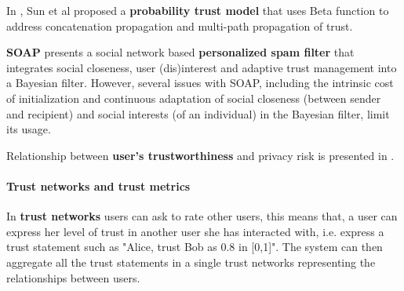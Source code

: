 
%
In \cite{zeng_trustaware_2014},
	Sun et al proposed a \textbf{probability trust model} that uses Beta function to address concatenation propagation and multi-path propagation of trust.


\textbf{SOAP} \cite{li_soap_2011} presents a social network based \textbf{personalized spam filter} that integrates social closeness,
	user (dis)interest and adaptive trust management into a Bayesian filter.
However,
	several issues with SOAP,
	including the intrinsic cost of initialization and continuous adaptation of social closeness (between sender and recipient) 
		and social interests (of an individual) in the Bayesian filter,
	limit its usage.

Relationship between \textbf{user’s trustworthiness} and privacy risk is presented in \cite{pandey_computing_2015}.





\paragraph{Trust networks and trust metrics}

In \textbf{trust networks} users can ask to rate other users,
	this means that,
	a user can express her level of trust in another user she has interacted with,
	i.e. express a trust statement such as "Alice, trust Bob as 0.8 in [0,1]".
The system can then aggregate all the trust statements in a single trust networks representing the relationships between users.

